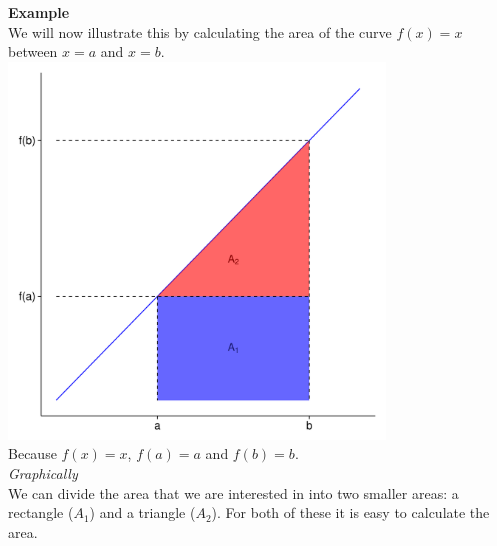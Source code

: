 \documentclass[a4paper]{report}
\begin{document}
\begin{mdframed}[backgroundcolor=exampcol]
\textbf{Example}\\
We will now illustrate this by calculating the area of the curve $f(x)=x$ between $x=a$ and $x=b$.\\
\includegraphics[width=0.75\textwidth]{int_graph4.pdf}\\
Because $f(x)=x$, $f(a)=a$ and $f(b)=b$.\\[0.5ex]
\noindent\textit{Graphically}\\
We can divide the area that we are interested in into two smaller areas: a rectangle ($A_1$) and a triangle ($A_2$). For both of these it is easy to calculate the area.


\end{mdframed}
\end{document}
